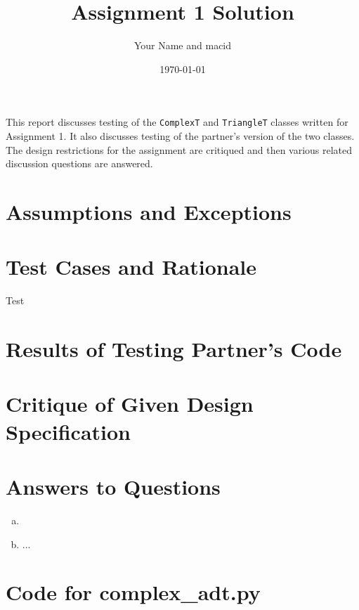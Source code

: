\documentclass[12pt]{article}
\title{Assignment 1 Solution}
\author{Your Name and macid}
\date{\today}
\begin{document}
\maketitle

This report discusses testing of the \verb|ComplexT| and \verb|TriangleT|
classes written for Assignment 1. It also discusses testing of the partner's
version of the two classes. The design restrictions for the assignment
are critiqued and then various related discussion questions are answered.

\section{Assumptions and Exceptions} \label{AssumptAndExcept}


\section{Test Cases and Rationale} \label{Testing}
Test

\section{Results of Testing Partner's Code}


\section{Critique of Given Design Specification}


\section{Answers to Questions}

\begin{enumerate}[(a)]

\item 
\item ...

\end{enumerate}

\newpage

\lstset{language=Python, basicstyle=\tiny, breaklines=true, showspaces=false,
  showstringspaces=false, breakatwhitespace=true}

\def\thesection{\Alph{section}}

\section{Code for complex\_adt.py}
\end{document}
